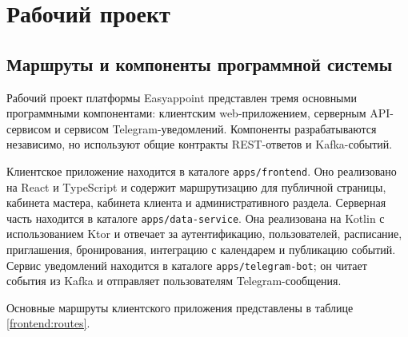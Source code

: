 \section{Рабочий проект}

\subsection{Маршруты и компоненты программной системы}

Рабочий проект платформы Easyappoint представлен тремя основными программными компонентами: клиентским web-приложением, серверным API-сервисом и сервисом Telegram-уведомлений. Компоненты разрабатываются независимо, но используют общие контракты REST-ответов и Kafka-событий.

Клиентское приложение находится в каталоге \texttt{apps/frontend}. Оно реализовано на React и TypeScript и содержит маршрутизацию для публичной страницы, кабинета мастера, кабинета клиента и административного раздела. Серверная часть находится в каталоге \texttt{apps/data-service}. Она реализована на Kotlin с использованием Ktor и отвечает за аутентификацию, пользователей, расписание, приглашения, бронирования, интеграцию с календарем и публикацию событий. Сервис уведомлений находится в каталоге \texttt{apps/telegram-bot}; он читает события из Kafka и отправляет пользователям Telegram-сообщения.

Основные маршруты клиентского приложения представлены в таблице \ref{frontend:routes}.

